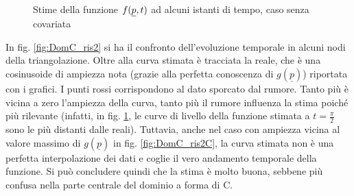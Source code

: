 \documentclass[a4paper,11pt,twoside,openright]{book}							%
\begin{document}
\begin{figure}[H]
{   }
	\caption{Stime della funzione $f(\protect\underline{p},t)$ ad alcuni istanti di tempo, caso senza covariata}
	\label{fig:DomC_ris}
\end{figure}

In fig. \ref{fig:DomC_ris2} si ha il confronto dell'evoluzione temporale in alcuni nodi della triangolazione. Oltre alla curva stimata è tracciata la reale, che è una cosinusoide di ampiezza nota (grazie alla perfetta conoscenza di $g(\underline p)$) riportata con i grafici. I punti rossi corrispondono al dato sporcato dal rumore. Tanto più è vicina a zero l'ampiezza della curva, tanto più il rumore influenza la stima poiché più rilevante (infatti, in fig. \ref{fig:DomC_ris}, le curve di livello della funzione stimata a $t=\frac{\pi}{2}$ sono le più distanti dalle reali). Tuttavia, anche nel caso con ampiezza vicina al valore massimo di $g(\underline p)$ in fig. \ref{fig:DomC_ris2C}, la curva stimata non è una perfetta interpolazione dei dati e coglie il vero andamento temporale della funzione. Si può concludere quindi che la stima è molto buona, sebbene più confusa nella parte centrale del dominio a forma di C.
\end{document}
